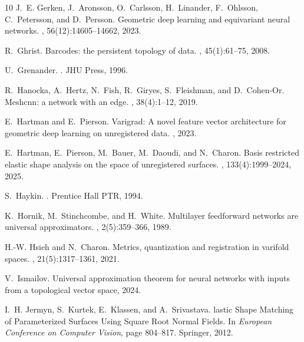 \documentclass[11pt]{article}
\begin{document}
\begin{thebibliography}{10}
J.~E. Gerken, J.~Aronsson, O.~Carlsson, H.~Linander, F.~Ohlsson, C.~Petersson, and D.~Persson.
\newblock Geometric deep learning and equivariant neural networks.
, 56(12):14605--14662, 2023.

R.~Ghrist.
\newblock Barcodes: the persistent topology of data.
, 45(1):61--75, 2008.

U.~Grenander.
.
\newblock JHU Press, 1996.

R.~Hanocka, A.~Hertz, N.~Fish, R.~Giryes, S.~Fleishman, and D.~Cohen-Or.
\newblock Meshcnn: a network with an edge.
, 38(4):1--12, 2019.

E.~Hartman and E.~Pierson.
\newblock Varigrad: A novel feature vector architecture for geometric deep learning on unregistered data.
, 2023.

E.~Hartman, E.~Pierson, M.~Bauer, M.~Daoudi, and N.~Charon.
\newblock Basis restricted elastic shape analysis on the space of unregistered surfaces.
, 133(4):1999--2024, 2025.

S.~Haykin.
.
\newblock Prentice Hall PTR, 1994.

K.~Hornik, M.~Stinchcombe, and H.~White.
\newblock Multilayer feedforward networks are universal approximators.
, 2(5):359--366, 1989.

H.-W. Hsieh and N.~Charon.
\newblock Metrics, quantization and registration in varifold spaces.
, 21(5):1317--1361, 2021.

V.~Ismailov.
\newblock Universal approximation theorem for neural networks with inputs from a topological vector space, 2024.

I.~H. Jermyn, S.~Kurtek, E.~Klassen, and A.~Srivastava.
lastic {S}hape {M}atching of {P}arameterized {S}urfaces {U}sing {S}quare {R}oot {N}ormal {F}ields.
\newblock In {\em European Conference on Computer Vision}, page 804–817. Springer, 2012.


\end{thebibliography}
\end{document}
